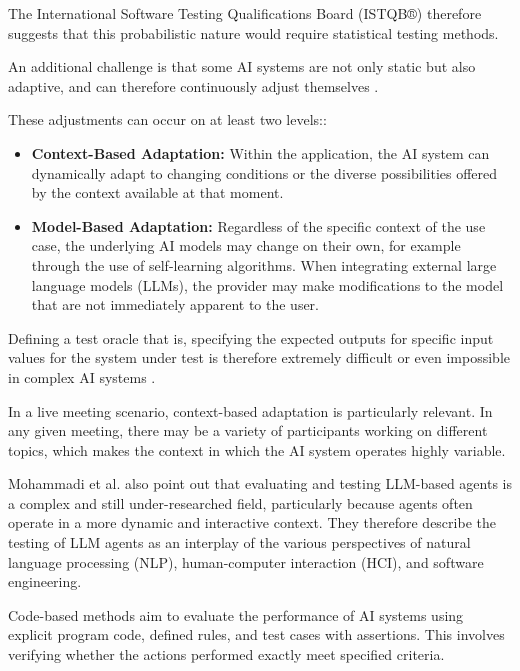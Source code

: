 The International Software Testing Qualifications Board (ISTQB®) therefore suggests that this probabilistic
nature would require statistical testing methods. \cite[p. 39]{istqbrISTQBCertifiedTester}

An additional challenge is that some AI systems are not only static but also
adaptive, and can therefore continuously adjust themselves \cite[p.~39]{istqbrISTQBCertifiedTester}.

These adjustments can occur on at least two levels::
\begin{itemize}
  \item \textbf{Context-Based Adaptation:} Within the application, the AI system can dynamically adapt to
    changing conditions or the diverse possibilities offered by the
    context available at that moment.
  \item \textbf{Model-Based Adaptation:} Regardless of the specific context of the use case, the
    underlying AI models may change on their own, for example through the use of self-learning algorithms. When
    integrating external large language models (LLMs), the provider may make modifications to the model
    that are not immediately apparent to the user.
\end{itemize}
Defining a test oracle that is, specifying the expected outputs for specific input values for the system
under test is therefore extremely difficult or even impossible in complex AI systems
\cite[p.~39]{istqbrISTQBCertifiedTester}.

In a live meeting scenario, context-based adaptation is particularly relevant. In any given meeting, there
may be a variety of participants working on different topics, which makes the context in which the AI system
operates highly variable.

Mohammadi et al. \cite[p. 1]{mohammadiEvaluationBenchmarkingLLM2025} also point out that evaluating and
testing LLM-based agents is a complex and still under-researched field, particularly because
agents often operate in a more dynamic and interactive context.
They therefore describe the testing of LLM agents as an interplay of the various perspectives of natural
language processing (NLP), human-computer interaction (HCI), and software engineering.

\label{sec:code-based-testing}
Code-based methods aim to evaluate the performance of AI systems using explicit
program code, defined rules, and test cases with assertions. This involves verifying whether the
actions performed exactly meet specified criteria. \cite[p. 7]{mohammadiEvaluationBenchmarkingLLM2025}

